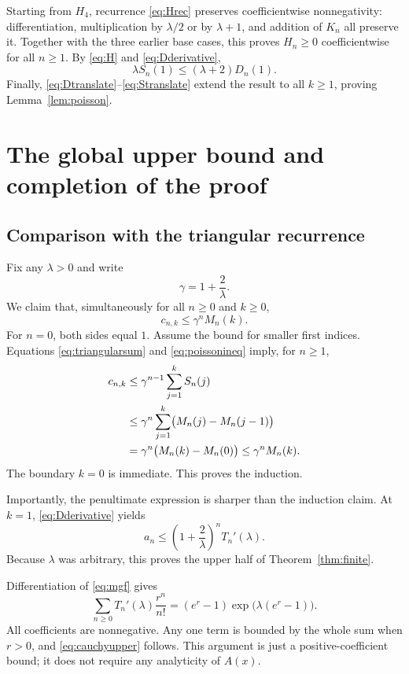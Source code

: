 \documentclass[11pt]{article}
\numberwithin{equation}{section}
\theoremstyle{definition}
\theoremstyle{remark}
\begin{document}
Starting from $H_4$, recurrence \eqref{eq:Hrec} preserves coefficientwise
nonnegativity: differentiation, multiplication by $\lambda/2$ or by
$\lambda+1$, and addition of $K_n$ all preserve it. Together with the
three earlier base cases, this proves $H_n\ge0$ coefficientwise for all
$n\ge1$. By \eqref{eq:H} and \eqref{eq:Dderivative},
\[
 \lambda S_n(1)\le(\lambda+2)D_n(1).
\]
Finally, \eqref{eq:Dtranslate}--\eqref{eq:Stranslate} extend the result to
all $k\ge1$, proving Lemma~\ref{lem:poisson}.

\section{The global upper bound and completion of the proof}

\subsection{Comparison with the triangular recurrence}

Fix any $\lambda>0$ and write
\[
 \gamma=1+\frac2\lambda.
\]
We claim that, simultaneously for all $n\ge0$ and $k\ge0$,
\begin{equation}\label{eq:majorant}
 c_{n,k}\le\gamma^n M_n(k).
\end{equation}
For $n=0$, both sides equal $1$. Assume the bound for smaller first
indices. Equations \eqref{eq:triangularsum} and \eqref{eq:poissonineq}
imply, for $n\ge1$,
\begin{align}
 c_{n,k}
 &\le\gamma^{n-1}\sum_{j=1}^k S_n(j)\notag\\
 &\le\gamma^n\sum_{j=1}^k\bigl(M_n(j)-M_n(j-1)\bigr)\notag\\
 &=\gamma^n\bigl(M_n(k)-M_n(0)\bigr)
 \le\gamma^n M_n(k).\label{eq:compareproof}
\end{align}
The boundary $k=0$ is immediate. This proves the induction.

Importantly, the penultimate expression is sharper than the induction
claim. At $k=1$, \eqref{eq:Dderivative} yields
\begin{equation}\label{eq:touchardupper}
 a_n\le\left(1+\frac2\lambda\right)^nT_n'(\lambda).
\end{equation}
Because $\lambda$ was arbitrary, this proves the upper half of
Theorem~\ref{thm:finite}.

Differentiation of \eqref{eq:mgf} gives
\[
 \sum_{n\ge0}T_n'(\lambda)\frac{r^n}{n!}
 =(e^r-1)\exp\!\bigl(\lambda(e^r-1)\bigr).
\]
All coefficients are nonnegative. Any one term is bounded by the whole
sum when $r>0$, and \eqref{eq:cauchyupper} follows. This argument is just
a positive-coefficient bound; it does not require any analyticity of
$A(x)$.
\end{document}
